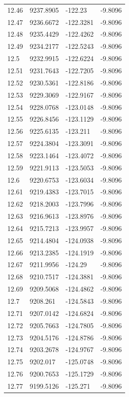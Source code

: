 \begin{table}[H]
\begin{tabular}{llll}
12.46 & 9237.8905 & -122.23 & -9.8096 \\
12.47 & 9236.6672 & -122.3281 & -9.8096 \\
12.48 & 9235.4429 & -122.4262 & -9.8096 \\
12.49 & 9234.2177 & -122.5243 & -9.8096 \\
12.5 & 9232.9915 & -122.6224 & -9.8096 \\
12.51 & 9231.7643 & -122.7205 & -9.8096 \\
12.52 & 9230.5361 & -122.8186 & -9.8096 \\
12.53 & 9229.3069 & -122.9167 & -9.8096 \\
12.54 & 9228.0768 & -123.0148 & -9.8096 \\
12.55 & 9226.8456 & -123.1129 & -9.8096 \\
12.56 & 9225.6135 & -123.211 & -9.8096 \\
12.57 & 9224.3804 & -123.3091 & -9.8096 \\
12.58 & 9223.1464 & -123.4072 & -9.8096 \\
12.59 & 9221.9113 & -123.5053 & -9.8096 \\
12.6 & 9220.6753 & -123.6034 & -9.8096 \\
12.61 & 9219.4383 & -123.7015 & -9.8096 \\
12.62 & 9218.2003 & -123.7996 & -9.8096 \\
12.63 & 9216.9613 & -123.8976 & -9.8096 \\
12.64 & 9215.7213 & -123.9957 & -9.8096 \\
12.65 & 9214.4804 & -124.0938 & -9.8096 \\
12.66 & 9213.2385 & -124.1919 & -9.8096 \\
12.67 & 9211.9956 & -124.29 & -9.8096 \\
12.68 & 9210.7517 & -124.3881 & -9.8096 \\
12.69 & 9209.5068 & -124.4862 & -9.8096 \\
12.7 & 9208.261 & -124.5843 & -9.8096 \\
12.71 & 9207.0142 & -124.6824 & -9.8096 \\
12.72 & 9205.7663 & -124.7805 & -9.8096 \\
12.73 & 9204.5176 & -124.8786 & -9.8096 \\
12.74 & 9203.2678 & -124.9767 & -9.8096 \\
12.75 & 9202.017 & -125.0748 & -9.8096 \\
12.76 & 9200.7653 & -125.1729 & -9.8096 \\
12.77 & 9199.5126 & -125.271 & -9.8096 \\

\end{tabular}
\end{table}
